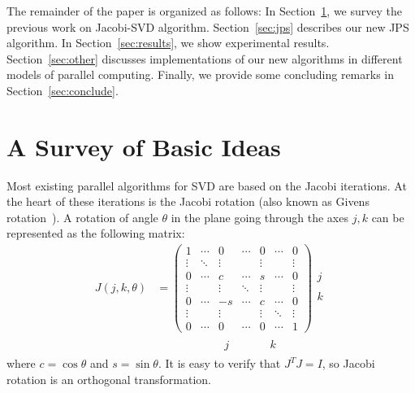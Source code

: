 \documentclass[10pt, conference, compsocconf]{IEEEtran}
\begin{document}
The remainder of the paper is organized as follows: In Section~\ref{sec:prevwork}, we survey the previous work on Jacobi-SVD algorithm.  Section~\ref{sec:jps} describes our new JPS algorithm. In Section~\ref{sec:results}, we show experimental results. Section~\ref{sec:other} discusses implementations of our new algorithms in different models of parallel computing. Finally, we provide some concluding remarks in Section~\ref{sec:conclude}.

\section{A Survey of Basic Ideas}
\label{sec:prevwork}

Most existing parallel algorithms for SVD are based on the Jacobi iterations. At the heart of these iterations is the Jacobi rotation (also known as Givens rotation~\cite{golub2012matrix}). A rotation of angle $\theta$ in the plane going through the axes $j,k$ can be represented as the following matrix:
\begin{align}
  J(j,k,\theta) &= \left( \begin{array}{ccccccc} 
  1 & \cdots & 0 & \cdots & 0 & \cdots & 0 \\
  \vdots & \ddots & \vdots & & \vdots & & \vdots \\
  0 & \cdots & c & \cdots & s & \cdots & 0 \\
  \vdots & & \vdots & \ddots  & \vdots & & \vdots \\
  0 & \cdots & -s & \cdots & c & \cdots & 0 \\
  \vdots & & \vdots & & \vdots  & \ddots  & \vdots \\
  0 & \cdots & 0 & \cdots & 0 & \cdots & 1
\end{array} \right)
\begin{array}{l}
  \\
  j \\
  \\
  k
  \\
  \\
\end{array} \\
& \begin{array}{ccccccc}
 \qquad &\qquad & j & \qquad & k & &
\end{array} \nonumber
\end{align}
where $c=\cos \theta$ and $s=\sin \theta$. It is easy to verify that $J^T J = I$, so Jacobi rotation is an orthogonal
transformation.
\end{document}
